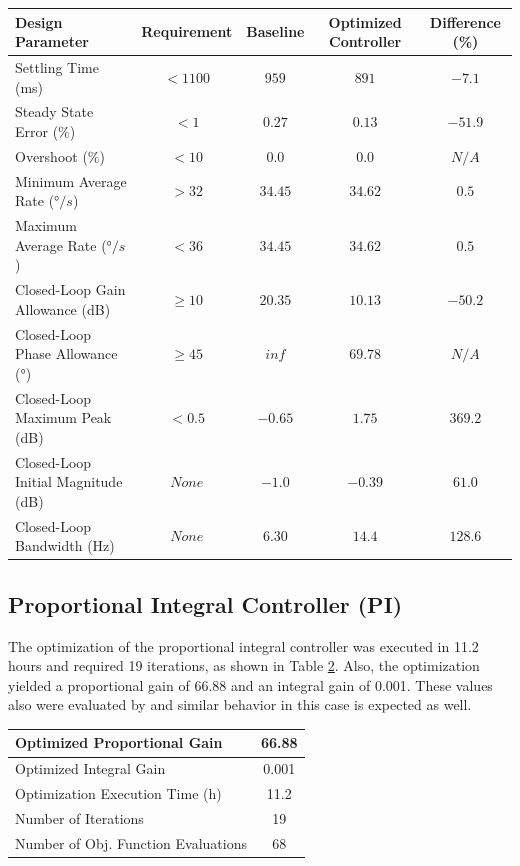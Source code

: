 \begin{table}[H]
	\label{table:5_1_1_P_PerfTable}
	\centering
	\resizebox{14cm}{!} {
		\begin{tabular}{|l|c|c|c|c|}
			\hline
			Design Parameter & Requirement & Baseline & Optimized Controller & Difference (\%) \\ \hline
			Settling Time (ms) & $< 1100$ & $959$ & $891$ & $-7.1$ \\ \hline
			Steady State Error ($\%$) & $< 1$ & $0.27$ & $0.13$ & $-51.9$ \\ \hline
			Overshoot ($\%$) & $< 10 $  & $0.0$ & $0.0$ & $N/A$ \\ \hline
			Minimum Average Rate ($°/s$) & $> 32$ & $34.45$ & $34.62$ & $0.5$ \\ \hline
			Maximum Average Rate ($°/s$) & $< 36$ & $34.45$ & $34.62$ & $0.5$ \\ \hline
			Closed-Loop Gain Allowance (dB) & $ \geq 10 $ & $20.35$ & $10.13$ & $-50.2$ \\ \hline
			Closed-Loop Phase Allowance ($°$) & $ \geq 45$ & $inf$ & $69.78$ & $N/A$ \\ \hline
			Closed-Loop Maximum Peak (dB) & $ < 0.5$ & $-0.65$ & $1.75$ & $369.2$ \\ \hline
			Closed-Loop Initial Magnitude (dB) & $None$ & $-1.0$ & $-0.39$ & $61.0$ \\ \hline
			Closed-Loop Bandwidth (Hz) & $None$ & $6.30$ & $14.4$ & $128.6$ \\ \hline
	\end{tabular}}
\end{table}

\subsection{Proportional Integral Controller (PI)}

The optimization of the proportional integral controller was executed in 11.2 hours and required 19 iterations, as shown in Table \ref{table:5_1_2_PIContExecution}. Also, the optimization yielded a proportional gain of 66.88 and an integral gain of 0.001. These values also were evaluated by  and similar behavior in this case is expected as well. 

\begin{table}[H]
	\label{table:5_1_2_PIContExecution}
	\centering
	\resizebox{7cm}{!} {
		\begin{tabular}{|l|c|}
			\hline
			Optimized Proportional Gain & 66.88 \\ \hline
			Optimized Integral Gain & 0.001 \\ \hline
			Optimization Execution Time (h) & 11.2 \\ \hline
			Number of Iterations & 19 \\ \hline			
			Number of Obj. Function Evaluations & 68 \\ \hline	
	\end{tabular}}
\end{table}

